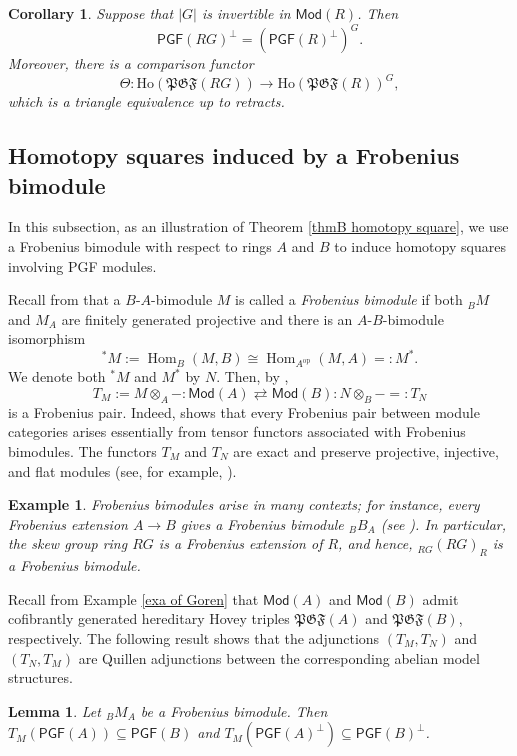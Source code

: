 \documentclass[12pt,twoside]{amsart}
\theoremstyle{bfupright head,slanted body}
\theoremstyle{bfupright head,upright body}
\theoremstyle{fixed bf head,slanted body}
\newtheorem{cor}[res]{Corollary}        \newtheorem*{cor*}{Corollary}
\newtheorem{lem}[res]{Lemma}            \newtheorem*{lem*}{Lemma}
\theoremstyle{fixed bf head,upright body}
\newtheorem{exa}[res]{Example}           \newtheorem*{exa*}{Example}
\theoremstyle{numbered paragraph}
\newcommand{\thmcite}[2][?]{\cite[Theorem~#1]{#2}}
\numberwithin{equation}{res}
\newcommand{\PGF}{\mathsf{PGF}}
\newcommand{\Mod}{\mathsf{Mod}}
\newcommand{\Ho}{\mathrm{Ho}}
\newcommand{\Hom}{\operatorname{Hom}}
\begin{document}
\begin{cor} \label{cor of PGF}
Suppose that \(|G|\) is invertible in \(\Mod(R)\). Then
\[
\PGF(RG)^\bot = (\PGF(R)^\bot)^G.
\]
Moreover, there is a comparison functor
\[
\Theta:\Ho(\mathfrak{PGF}(RG)) \longrightarrow \Ho(\mathfrak{PGF}(R))^G,
\]
which is a triangle equivalence up to retracts.
\end{cor}

\subsection{Homotopy squares induced by a Frobenius bimodule}
\label{Homotopy squares via bimodule}%
\noindent
In this subsection, as an illustration of Theorem \ref{thmB homotopy square}, we use a Frobenius bimodule with respect to rings \(A\) and \(B\) to induce homotopy squares involving PGF modules.

Recall from \cite{1992AF} that a \(B\)-\(A\)-bimodule \(M\) is called a \emph{Frobenius bimodule} if both \({}_B M\) and \(M_A\) are finitely generated projective and there is an \(A\)-\(B\)-bimodule isomorphism
\[
{}^*M:=\Hom_B(M,B)\cong \Hom_{A^{\mathrm{op}}}(M,A)=:M^*.
\]
We denote both \({}^*M\) and \(M^*\) by \(N\). Then, by \thmcite[2.1]{1999CJG},
\[
T_M:=M\otimes_A-:\Mod(A)\rightleftarrows\Mod(B):N\otimes_B-=:T_N
\]
is a Frobenius pair. Indeed, \thmcite[2.1]{1999CJG} shows that every Frobenius pair between module categories arises essentially from tensor functors associated with Frobenius bimodules. The functors \(T_M\) and \(T_N\) are exact and preserve projective, injective, and flat modules (see, for example, \cite[2.1]{2020HLGZ}).

\begin{exa}
Frobenius bimodules arise in many contexts; for instance, every Frobenius extension \(A\to B\) gives a Frobenius bimodule \({}_B B_A\) (see \cite{KL99}). In particular, the skew group ring \(RG\) is a Frobenius extension of \(R\), and hence, \(_{RG}(RG)_R\) is a Frobenius bimodule.
\end{exa}

Recall from Example \ref{exa of Goren} that \(\Mod(A)\) and \(\Mod(B)\) admit cofibrantly generated hereditary Hovey triples \(\mathfrak{PGF}(A)\) and \(\mathfrak{PGF}(B)\), respectively.
The following result shows that the adjunctions \((T_M,T_N)\) and \((T_N,T_M)\) are Quillen adjunctions between the corresponding abelian model structures.

\begin{lem} \label{TM Quillen adj}
Let $_BM_A$ be a Frobenius bimodule.
Then $T_M(\PGF(A)) \subseteq \PGF(B)$ and $T_M(\PGF(A)^\bot) \subseteq \PGF(B)^\bot$.
\end{lem}
\end{document}
